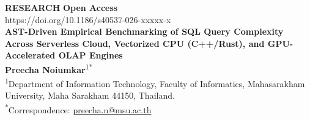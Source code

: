 \documentclass[10pt,a4paper]{article}
\begin{document}
{\footnotesize\sffamily\color{springerblue}\textbf{RESEARCH} \hfill \textbf{Open Access}}\\[0.2em]
{\footnotesize\sffamily https://doi.org/10.1186/s40537-026-xxxxx-x}\\[0.8em]

{\LARGE\sffamily\bfseries AST-Driven Empirical Benchmarking of SQL Query Complexity Across Serverless Cloud, Vectorized CPU (C++/Rust), and GPU-Accelerated OLAP Engines}\\[0.9em]

{\normalsize\sffamily\textbf{Preecha Noiumkar}\textsuperscript{1*}}\\[0.4em]
{\footnotesize\sffamily
\textsuperscript{1}Department of Information Technology, Faculty of Informatics, Mahasarakham University, Maha Sarakham 44150, Thailand.\\
\textsuperscript{*}Correspondence: \href{mailto:preecha.n@msu.ac.th}{preecha.n@msu.ac.th}
}\\[0.8em]
\end{document}
